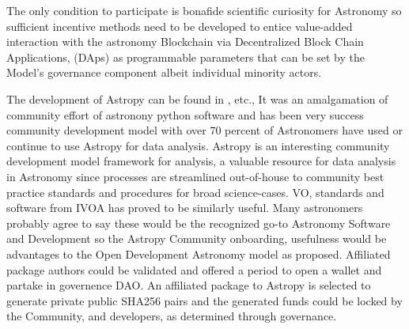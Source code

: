 \documentclass[final,5p,times,twocolumn,authoryear]{elsarticle}
\begin{document}
The only condition to participate is bonafide scientific curiosity for Astronomy so sufficient incentive methods need to be developed to entice value-added interaction with the astronomy Blockchain via Decentralized Block Chain Applications, (DAps) as programmable parameters that can be set by the Model's governance component albeit individual minority actors. 


The development of Astropy  can be found in \cite{robitaille_astropy:_2013}, etc.,  It was an amalgamation of community effort of astronony python software and has been very success community development model with over 70 percent of Astronomers have used or continue to use Astropy for data analysis. Astropy is an interesting community development model framework for analysis,  a valuable resource for data analysis in Astronomy since processes are streamlined out-of-house to community best practice standards and procedures for broad science-cases. VO, standards and software from IVOA has proved to be similarly useful. Many astronomers probably agree to say these would be the recognized go-to  Astronomy Software and Development so the Astropy Community onboarding, usefulness would be advantages to the Open Development Astronomy model as proposed. Affiliated package authors could be validated and offered a period to open a wallet and partake in governence DAO. An affiliated package to Astropy is selected to generate private public SHA256 pairs and the generated funds could be locked by the Community, and developers, as determined through governance. 
\end{document}
